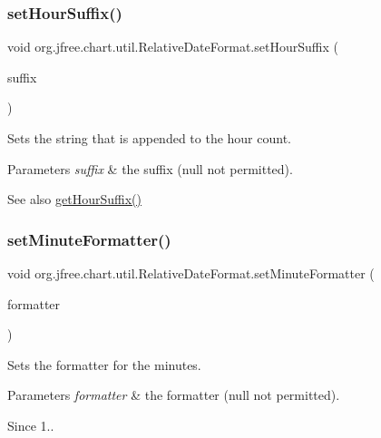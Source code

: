 \subsubsection{\texorpdfstring{set\+Hour\+Suffix()}{setHourSuffix()}}
{\footnotesize\ttfamily void org.\+jfree.\+chart.\+util.\+Relative\+Date\+Format.\+set\+Hour\+Suffix (\begin{DoxyParamCaption}\item[{String}]{suffix }\end{DoxyParamCaption})}

Sets the string that is appended to the hour count.


\begin{DoxyParams}{Parameters}
{\em suffix} & the suffix ({\ttfamily null} not permitted).\\
\hline
\end{DoxyParams}
\begin{DoxySeeAlso}{See also}
\mbox{\hyperlink{classorg_1_1jfree_1_1chart_1_1util_1_1_relative_date_format_aa2ed5b91f1be19847c95c52d6a0d43a8}{get\+Hour\+Suffix()}} 
\end{DoxySeeAlso}
\mbox{\label{classorg_1_1jfree_1_1chart_1_1util_1_1_relative_date_format_a4ac6f1fa5839cc73bdeedc14d5e13c1a}} 
\subsubsection{\texorpdfstring{set\+Minute\+Formatter()}{setMinuteFormatter()}}
{\footnotesize\ttfamily void org.\+jfree.\+chart.\+util.\+Relative\+Date\+Format.\+set\+Minute\+Formatter (\begin{DoxyParamCaption}\item[{Number\+Format}]{formatter }\end{DoxyParamCaption})}

Sets the formatter for the minutes.


\begin{DoxyParams}{Parameters}
{\em formatter} & the formatter ({\ttfamily null} not permitted).\\
\hline
\end{DoxyParams}
\begin{DoxySince}{Since}
1.. 
\end{DoxySince}
\mbox{\label{classorg_1_1jfree_1_1chart_1_1util_1_1_relative_date_format_af5699d455b828c1b1f9dc67eabe64d7c}} 

